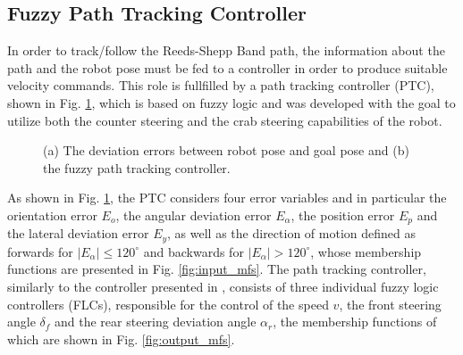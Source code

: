 \documentclass[conference]{IEEEtran}
\begin{document}
\subsection{Fuzzy Path Tracking Controller}
In order to track/follow the Reeds-Shepp Band path, the information about the path and the robot pose must be fed to a controller in order to produce suitable velocity commands. This role is fullfilled by a path tracking controller (PTC), shown in Fig. \ref{fig:ptc_and_errors}, which is based on fuzzy logic and was developed with the goal to utilize both the counter steering and the crab steering capabilities of the robot.

\begin{figure}[!ht]
	\centering
	\caption{(a) The deviation errors between robot pose and goal pose and (b) the fuzzy path tracking controller.}
	\label{fig:ptc_and_errors}
\end{figure}

As shown in Fig. \ref{fig:ptc_and_errors}, the PTC considers four error variables and in particular the orientation error $E_o$, the angular deviation error $E_\alpha$, the position error $E_p$ and the lateral deviation error $E_y$, as well as the direction of motion defined as forwards for $|E_\alpha| \leq 120^\circ$ and backwards for $|E_\alpha| > 120^\circ$, whose membership functions are presented in Fig. \ref{fig:input_mfs}. The path tracking controller, similarly to the controller presented in \cite{reactive_fuzzy_ptc}, consists of three individual fuzzy logic controllers (FLCs), responsible for the control of the speed $v$, the front steering angle $\delta_f$ and the rear steering deviation angle $\alpha_r$, the membership functions of which are shown in Fig. \ref{fig:output_mfs}.
\end{document}
